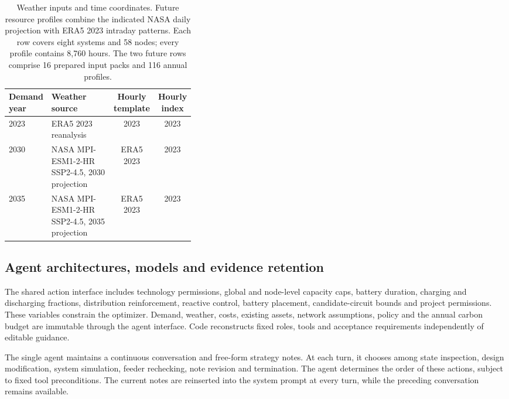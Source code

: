 \documentclass[pdflatex,sn-nature]{sn-jnl}
\begin{document}
\begin{table}[tbp]
\caption{Weather inputs and time coordinates. Future resource profiles combine the indicated NASA daily projection with ERA5 2023 intraday patterns. Each row covers eight systems and 58 nodes; every profile contains 8,760 hours. The two future rows comprise 16 prepared input packs and 116 annual profiles.}
\label{tab:future-weather-inputs}
\centering\small
\begin{tabular}{@{}l >{\raggedright\arraybackslash}p{0.37\linewidth} c c@{}}
\toprule
Demand year & Weather source & Hourly template & Hourly index\\
\midrule
2023 & ERA5 2023 reanalysis & 2023 & 2023\\
2030 & NASA MPI-ESM1-2-HR SSP2-4.5, 2030 projection & ERA5 2023 & 2023\\
2035 & NASA MPI-ESM1-2-HR SSP2-4.5, 2035 projection & ERA5 2023 & 2023\\
\bottomrule
\end{tabular}
\end{table}

\subsection{Agent architectures, models and evidence retention}

The shared action interface includes technology permissions, global and node-level capacity caps, battery duration, charging and discharging fractions, distribution reinforcement, reactive control, battery placement, candidate-circuit bounds and project permissions. These variables constrain the optimizer. Demand, weather, costs, existing assets, network assumptions, policy and the annual carbon budget are immutable through the agent interface. Code reconstructs fixed roles, tools and acceptance requirements independently of editable guidance.

The single agent maintains a continuous conversation and free-form strategy notes. At each turn, it chooses among state inspection, design modification, system simulation, feeder rechecking, note revision and termination. The agent determines the order of these actions, subject to fixed tool preconditions. The current notes are reinserted into the system prompt at every turn, while the preceding conversation remains available.
\end{document}
